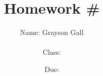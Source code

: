 \documentclass{article}
\title{\textbf{Homework \#}}
\author{
    Name: Grayson Gall
    \\ \\
    Class:
}
\date{Due: }
\begin{document}
\maketitle
\newpage

\section{}



\end{document}
